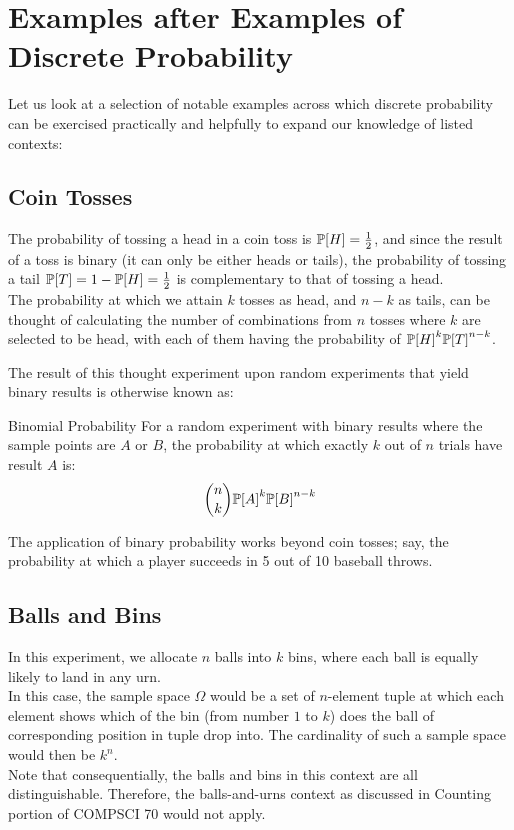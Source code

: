 \section{Examples after Examples of Discrete Probability}
Let us look at a selection of notable examples across which discrete probability can be exercised practically and helpfully to expand our knowledge of listed contexts:

\subsection{Coin Tosses}
The probability of tossing a head in a coin toss is $\P[H] = \frac{1}{2}$, and since the result of a toss is binary (it can only be either heads or tails), the probability of tossing a tail $\P[T] = 1 - \P[H] = \frac{1}{2}$ is complementary to that of tossing a head. \\
The probability at which we attain $k$ tosses as head, and $n - k$ as tails, can be thought of calculating the number of combinations from $n$ tosses where $k$ are selected to be head, with each of them having the probability of ${\P[H]}^k {\P[T]}^{n - k}$.

The result of this thought experiment upon random experiments that yield binary results is otherwise known as:
\begin{ln-define}{Binomial Probability}{}
    For a random experiment with binary results where the sample points are $A$ or $B$, the probability at which exactly $k$ out of $n$ trials have result $A$ is:
    \[\binom{n}{k} {\P[A]}^k {\P[B]}^{n - k}\]
\end{ln-define}
The application of binary probability works beyond coin tosses; say, the probability at which a player succeeds in 5 out of 10 baseball throws.

\subsection{Balls and Bins}
In this experiment, we allocate $n$ balls into $k$ bins, where each ball is equally likely to land in any urn. \\
In this case, the sample space $\Omega$ would be a set of $n$-element tuple at which each element shows which of the bin (from number $1$ to $k$) does the ball of corresponding position in tuple drop into. The cardinality of such a sample space would then be ${k}^{n}$. \\
Note that consequentially, the balls and bins in this context are all distinguishable. Therefore, the balls-and-urns context as discussed in Counting portion of COMPSCI 70 would not apply.

